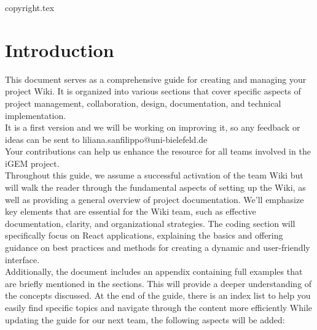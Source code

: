\documentclass[a4paper, 11pt, twoside]{book}
\begin{document}
\pagecolor{pagecolor}
\frontmatter

\tableofcontents
\newpage

{copyright.tex}
\pagecolor{pagecolor}


\section{Introduction}
This document serves as a comprehensive guide for creating and managing your project Wiki. It is organized into various sections that cover specific aspects of project management, collaboration, design, documentation, and technical implementation. \\
It is a first version and we will be working on improving it, so any feedback or ideas can be sent to liliana.sanfilippo@uni-bielefeld.de \\
Your contributions can help us enhance the resource for all teams involved in the iGEM project. \\ \newline
Throughout this guide, we assume a successful activation of the team Wiki but will walk the reader through the fundamental aspects of setting up the Wiki, as well as providing a general overview of project documentation. We'll emphasize key elements that are essential for the Wiki team, such as effective documentation, clarity, and organizational strategies. The coding section will specifically focus on React applications, explaining the basics and offering guidance on best practices and methods for creating a dynamic and user-friendly interface. \\ \newline
Additionally, the document includes an appendix containing full examples that are briefly mentioned in the sections. This will provide a deeper understanding of the concepts discussed. At the end of the guide, there is an index list to help you easily find specific topics and navigate through the content more efficiently
While updating the guide for our next team, the following aspects will be added:
\end{document}
